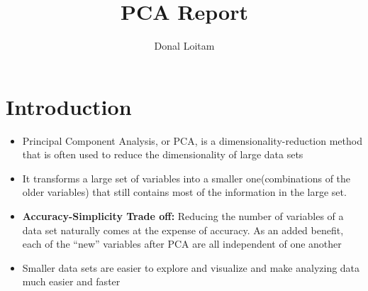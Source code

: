 \documentclass[a4paper, 11pt]{article}
\title{PCA Report}
\author{Donal Loitam}
\begin{document}
\maketitle
\tableofcontents

\section{Introduction}
\begin{itemize}
    \item Principal Component Analysis, or PCA, is a dimensionality-reduction method that is often used to reduce the dimensionality of large data sets
    \item It transforms a large set of variables into a smaller one(combinations of the older variables) that still contains most of the information in the large set.
    \item \textbf{Accuracy-Simplicity Trade off: }Reducing the number of variables of a data set naturally comes at the expense of accuracy. As an added benefit, each of the “new” variables after PCA are all independent of one another
    \item Smaller data sets are easier to explore and visualize and make analyzing data much easier and faster
\end{itemize}
\end{document}
